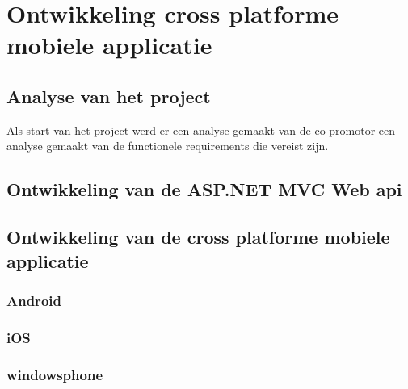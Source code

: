 \chapter{Ontwikkeling cross platforme mobiele applicatie}
\label{ch:ontwikkelingkcrossplatformapp}
\section{Analyse van het project}
Als start van het project werd er een analyse gemaakt van de co-promotor
een analyse gemaakt van de functionele requirements die vereist zijn.

\section{Ontwikkeling van de ASP.NET MVC Web api}
\section{Ontwikkeling van de cross platforme mobiele applicatie}
\subsection{Android}
\subsection{iOS}
\subsection{windowsphone}
